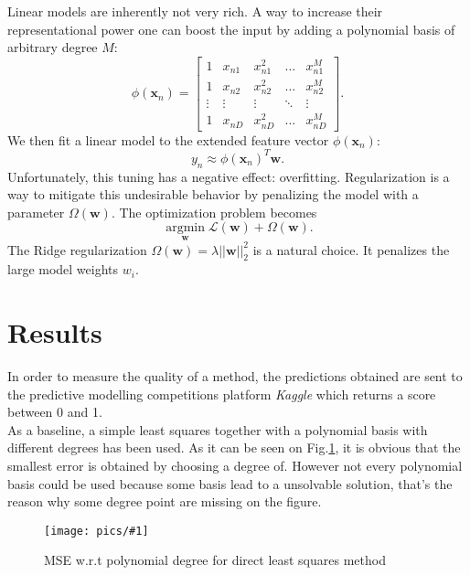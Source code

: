 \documentclass[10pt,conference,compsocconf]{IEEEtran}
\newcommand{\scalefig}[4]{
  \begin{figure}[ht!]
    \centering
    \texttt{[image: pics/\#1]}
 \caption{#3}
    \label{#4}
  \end{figure}}
\newcommand{\xx}{\mathbf{x}}
\newcommand{\ww}{\mathbf{w}}
\newcommand{\Lagr}{\mathcal{L}}
\newcommand{\argmin}[1]{\underset{#1}{\operatorname{argmin}}}
\begin{document}
Linear models are inherently not very rich. A way to increase their representational power  one can boost the input by adding a polynomial basis of arbitrary degree $M$:
$$
\phi(\xx_n) = \begin{bmatrix} 1 & x_{n1} & x_{n1}^2 & \hdots & x_{n1}^M \\ 1& x_{n2} & x_{n2}^2 & \hdots & x_{n2}^M \\ \vdots & \vdots & \vdots & \ddots & \vdots \\ 1& x_{nD} & x_{nD}^2 & \hdots & x_{nD}^M \end{bmatrix}.
$$
We then fit a linear model to the extended feature vector $\phi(\xx_n)$:
$$
y_n \approx \phi(\xx_n)^T\ww.
$$
Unfortunately, this tuning has a negative effect: overfitting. Regularization is a
way to mitigate this undesirable behavior by penalizing the model with a parameter $\Omega(\ww)$. The optimization problem becomes
$$
\argmin{\ww} \Lagr(\ww) + \Omega(\ww).
$$ 
The Ridge regularization $\Omega(\ww) = \lambda || \ww ||_2^2$ is a natural choice. It penalizes the large model weights $w_i$.




\section{Results}
In order to measure the quality of a method, the predictions obtained are sent to the predictive modelling competitions platform \textit{Kaggle} which returns a score between 0 and 1. \\
As a baseline, a simple least squares together with a polynomial basis with different degrees has been used. As it can be seen on Fig.\ref{fig:cross_validation_least_poly}, it is obvious that the smallest error is obtained by choosing a degree of. However not every polynomial basis could be used because some basis lead to a unsolvable solution, that's the reason why some degree point are missing on the figure.
\scalefig{cross_validation_least_poly}{1}{MSE w.r.t polynomial degree for direct least squares method}{fig:cross_validation_least_poly}
\end{document}
